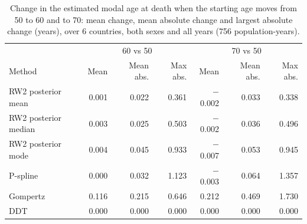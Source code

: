 \begin{table}[htb!]
\centering
\caption{Change in the estimated modal age at death when the starting age moves from 50 to 60 and to 70: mean change, mean absolute change and largest absolute change (years), over 6 countries, both sexes and all years (756 population-years).}
\label{tab:start_age}
\small
\begin{tabular}{lrrrrrr}
\hline
 & \multicolumn{3}{c}{60 vs 50} & \multicolumn{3}{c}{70 vs 50} \\
Method & Mean & Mean abs. & Max abs. & Mean & Mean abs. & Max abs. \\
\hline
RW2 posterior mean & 0.001 & 0.022 & 0.361 & $-$0.002 & 0.033 & 0.338 \\
RW2 posterior median & 0.003 & 0.025 & 0.503 & $-$0.002 & 0.036 & 0.496 \\
RW2 posterior mode & 0.004 & 0.045 & 0.933 & $-$0.007 & 0.053 & 0.945 \\
P-spline & 0.000 & 0.032 & 1.123 & $-$0.003 & 0.064 & 1.357 \\
Gompertz & 0.116 & 0.215 & 0.646 & 0.212 & 0.469 & 1.730 \\
DDT & 0.000 & 0.000 & 0.000 & 0.000 & 0.000 & 0.000 \\
\hline
\end{tabular}
\end{table}
